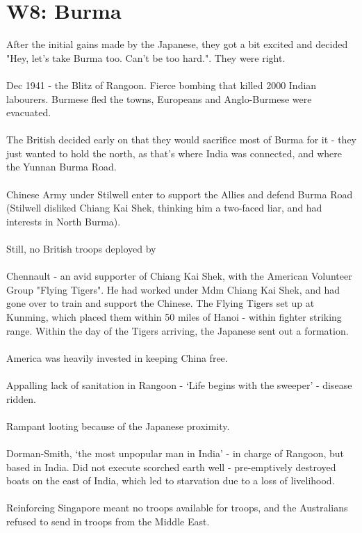 \documentclass[a4paper]{article}
\begin{document}
\section{W8: Burma}
After the initial gains made by the Japanese, they got a bit excited and decided "Hey, let's take Burma too. Can't be too hard.". They were right.\\
\\
Dec 1941 - the Blitz of Rangoon. Fierce bombing that killed 2000 Indian labourers. Burmese fled the towns, Europeans and Anglo-Burmese were evacuated.\\ 
\\
The British decided early on that they would sacrifice most of Burma for it - they just wanted to hold the north, as that's where India was connected, and where the Yunnan Burma Road.\\
\\
Chinese Army under Stilwell enter to support the Allies and defend Burma Road (Stilwell disliked Chiang Kai Shek, thinking him a two-faced liar, and had interests in North Burma).\\
\\
Still, no British troops deployed by \\
\\
Chennault - an avid supporter of Chiang Kai Shek, with the American Volunteer Group "Flying Tigers". He had worked under Mdm Chiang Kai Shek, and had gone over to train and support the Chinese. The Flying Tigers set up at Kunming, which placed them within 50 miles of Hanoi - within fighter striking range. Within the day of the Tigers arriving, the Japanese sent out a formation.\\
\\
America was heavily invested in keeping China free.\\
\\
Appalling lack of sanitation in Rangoon - `Life begins with the sweeper' - disease ridden.\\
\\
Rampant looting because of the Japanese proximity.\\
\\
Dorman-Smith, `the most unpopular man in India' - in charge of Rangoon, but based in India. Did not execute scorched earth well - pre-emptively destroyed boats on the east of India, which led to starvation due to a loss of livelihood.\\
\\
Reinforcing Singapore meant no troops available for troops, and the Australians refused to send in troops from the Middle East.\\ 
\end{document}

